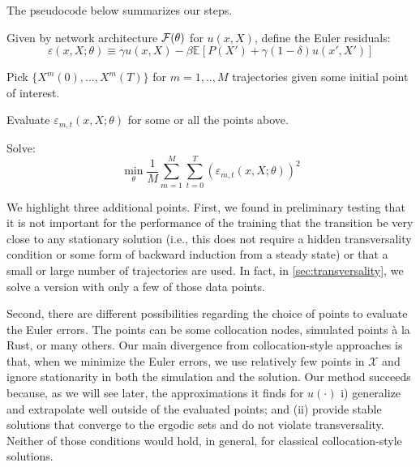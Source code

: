 \documentclass[12pt]{article}
\newcommand{\expec}[2][]{\ensuremath{\mathbb{E}_{{#1}}\left[ {#2} \right]}}
\begin{document}
The pseudocode below summarizes our steps.

\renewcommand{\thealgorithm}{}
\begin{algorithm}[H]
\caption{Network training} 
\begin{algorithmic}[1]

\State Given by network architecture $\cal{F(\theta)}$ for $u(x,X)$, define the Euler residuals:\vspace{-0.1in}
\begin{equation*}
\varepsilon(x,X;\theta) \equiv \gamma u(x,X) - \beta \expec{P(X') +\gamma (1-\delta) u(x',X') }
\end{equation*}
\vspace{-0.22in}

\State Pick $\{X^m(0),..., X^m(T)\}$ for $m=1,.., M$ trajectories given some initial point of interest.\vspace{0.1in}

\State Evaluate $\varepsilon_{m,t}(x,X;\theta)$ for some or all the points above.\vspace{0.1in}

\State Solve:
\vspace{-0.1in}
\begin{equation*}
\min_{\theta} \frac{1}{M}\sum_{m=1}^{M} \sum_{t=0}^{T}\left( \varepsilon_{m,t} (x,X;\theta) \right)^2\end{equation*}
\vspace{-0.11in}

\end{algorithmic} 
\end{algorithm}

We highlight three additional points. First, we found in preliminary testing that it is not important for the performance of the training that the transition be very close to any stationary solution (i.e., this does not require a hidden transversality condition or some form of backward induction from a steady state) or that a small or large number of trajectories are used. In fact, in \cref{sec:transversality}, we solve a version with only a few of those data points.

Second, there are different possibilities regarding the choice of points to evaluate the Euler errors. The points can be some collocation nodes, simulated points \`a la Rust, or many others. Our main divergence from collocation-style approaches is that, when we minimize the Euler errors, we use relatively few points in $\mathcal{X}$ and ignore stationarity in both the simulation and the solution. Our method succeeds because, as we will see later, the approximations it finds for $u(\cdot)$ i) generalize and extrapolate well outside of the evaluated points; and (ii) provide stable solutions that converge to the ergodic sets and do not violate transversality. Neither of those conditions would hold, in general, for classical collocation-style solutions.
\end{document}
